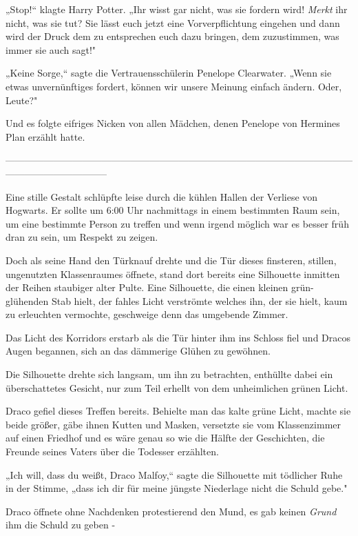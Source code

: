 {„Stop!“ klagte Harry Potter. „Ihr wisst gar nicht, was sie fordern wird! \emph{Merkt} ihr nicht, was sie tut? Sie lässt euch jetzt eine Vorverpflichtung eingehen und dann wird der Druck dem zu entsprechen euch dazu bringen, dem zuzustimmen, was immer sie auch sagt!"

„Keine Sorge,“ sagte die Vertrauensschülerin Penelope Clearwater. „Wenn sie etwas unvernünftiges fordert, können wir unsere Meinung einfach ändern. Oder, Leute?"

Und es folgte eifriges Nicken von allen Mädchen, denen Penelope von Hermines Plan erzählt hatte.

--------------------------------------------------------------------------------------------------------------------------------------------

\hfill\break Eine stille Gestalt schlüpfte leise durch die kühlen Hallen der Verliese von Hogwarts. Er sollte um 6:00 Uhr nachmittags in einem bestimmten Raum sein, um eine bestimmte Person zu treffen und wenn irgend möglich war es besser früh dran zu sein, um Respekt zu zeigen.

Doch als seine Hand den Türknauf drehte und die Tür dieses finsteren, stillen, ungenutzten Klassenraumes öffnete, stand dort bereits eine Silhouette inmitten der Reihen staubiger alter Pulte. Eine Silhouette, die einen kleinen grün-glühenden Stab hielt, der fahles Licht verströmte welches ihn, der sie hielt, kaum zu erleuchten vermochte, geschweige denn das umgebende Zimmer.

Das Licht des Korridors erstarb als die Tür hinter ihm ins Schloss fiel und Dracos Augen begannen, sich an das dämmerige Glühen zu gewöhnen.

Die Silhouette drehte sich langsam, um ihn zu betrachten, enthüllte dabei ein überschattetes Gesicht, nur zum Teil erhellt von dem unheimlichen grünen Licht.

Draco gefiel dieses Treffen bereits. Behielte man das kalte grüne Licht, machte sie beide größer, gäbe ihnen Kutten und Masken, versetzte sie vom Klassenzimmer auf einen Friedhof und es wäre genau so wie die Hälfte der Geschichten, die Freunde seines Vaters über die Todesser erzählten.

„Ich will, dass du weißt, Draco Malfoy,“ sagte die Silhouette mit tödlicher Ruhe in der Stimme, „dass ich dir für meine jüngste Niederlage nicht die Schuld gebe."

Draco öffnete ohne Nachdenken protestierend den Mund, es gab keinen \emph{Grund} ihm die Schuld zu geben -

}
